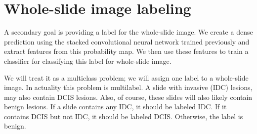 \documentclass[journal]{IEEEtran}
\begin{document}
%




\section{Whole-slide image labeling}
A secondary goal is providing a label for the whole-slide image. We create a dense prediction using the stacked convolutional neural network trained previously and extract features from this probability map. We then use these features to train a classifier for classifying this label for whole-slide image.

We will treat it as a multiclass problem; we will assign one label to a whole-slide image. In actuality this problem is multilabel. A slide with invasive (IDC) lesions, may also contain DCIS lesions. Also, of course, these slides will also likely contain benign lesions. If a slide contains any IDC, it should be labeled IDC. If it contains DCIS but not IDC, it should be labeled DCIS. Otherwise, the label is benign.
\end{document}
